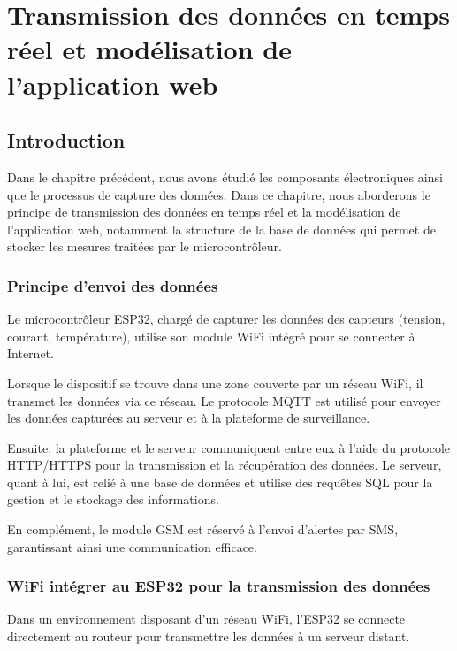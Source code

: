 \chapter{Transmission des données en temps réel et modélisation de l'application web}
\section{Introduction}
Dans le chapitre précédent, nous avons étudié les composants électroniques ainsi que le processus de capture des données. Dans ce chapitre, nous aborderons le principe de transmission des données en temps réel et la modélisation de l'application web, notamment la structure de la base de données qui permet de stocker les mesures traitées par le microcontrôleur. 

\subsection{Principe d'envoi des données}

Le microcontrôleur ESP32, chargé de capturer les données des capteurs (tension, courant, température), utilise son module WiFi intégré pour se connecter à Internet.

Lorsque le dispositif se trouve dans une zone couverte par un réseau WiFi, il transmet les données via ce réseau. Le protocole MQTT est utilisé pour envoyer les données capturées au serveur et à la plateforme de surveillance.

Ensuite, la plateforme et le serveur communiquent entre eux à l'aide du protocole HTTP/HTTPS pour la transmission et la récupération des données. Le serveur, quant à lui, est relié à une base de données et utilise des requêtes SQL pour la gestion et le stockage des informations.

En complément, le module GSM est réservé à l'envoi d'alertes par SMS, garantissant ainsi une communication efficace.



\subsection{ WiFi intégrer au ESP32 pour la transmission des données}
Dans un environnement disposant d'un réseau WiFi, l'ESP32 se connecte directement au routeur pour transmettre les données à un serveur distant.\\

